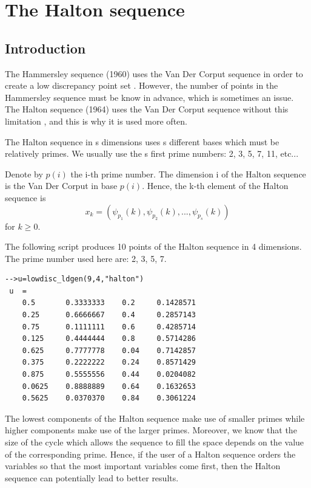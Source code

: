 %

\chapter{The Halton sequence}

\section{Introduction}
    
The Hammersley sequence (1960) uses the Van Der Corput sequence
in order to create a low discrepancy point set \cite{Hammersley1960}.
However, the number of points in the Hammersley sequence must be know
in advance, which is sometimes an issue.
The Halton sequence (1964) uses the Van Der Corput sequence without
this limitation \cite{Halton1964}, and this is why it is used more often.

The Halton sequence in s dimensions uses s
different bases which must be relatively primes.
We usually use the s first prime numbers: 2, 3, 5, 7, 11, etc...

Denote by $p(i)$ the i-th prime number.
The dimension i of the Halton sequence is
the Van Der Corput in base $p(i)$.
Hence, the k-th element of the Halton sequence is
$$
  x_k=(\psi_{p_1}(k),\psi_{p_2}(k),...,\psi_{p_s}(k))
$$
for $k\geq 0$.

The following script produces 10 points of the Halton sequence
in 4 dimensions.
The prime number used here are: 2, 3, 5, 7.
    

\lstset{language=scilabscript}
\begin{lstlisting}
-->u=lowdisc_ldgen(9,4,"halton")
 u  =
    0.5       0.3333333    0.2     0.1428571  
    0.25      0.6666667    0.4     0.2857143  
    0.75      0.1111111    0.6     0.4285714  
    0.125     0.4444444    0.8     0.5714286  
    0.625     0.7777778    0.04    0.7142857  
    0.375     0.2222222    0.24    0.8571429  
    0.875     0.5555556    0.44    0.0204082  
    0.0625    0.8888889    0.64    0.1632653  
    0.5625    0.0370370    0.84    0.3061224  
\end{lstlisting}

The lowest components of the Halton sequence 
make use of smaller primes while higher components 
make use of the larger primes. 
Moreover, we know that the size of the cycle which 
allows the sequence to fill the space depends 
on the value of the corresponding prime. 
Hence, if the user of a Halton sequence orders the 
variables so that the most important variables come 
first, then the Halton sequence can potentially lead 
to better results. 

